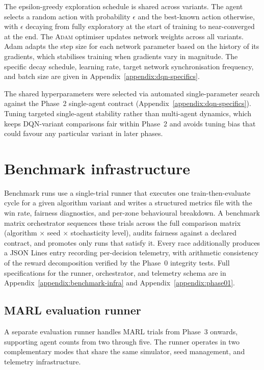 The epsilon-greedy exploration schedule is shared across variants. The agent selects a random action with probability $\epsilon$ and the best-known action otherwise, with $\epsilon$ decaying from fully exploratory at the start of training to near-converged at the end. The \textsc{Adam} optimiser \citep{kingma2015adam} updates network weights across all variants. Adam adapts the step size for each network parameter based on the history of its gradients, which stabilises training when gradients vary in magnitude. The specific decay schedule, learning rate, target network synchronisation frequency, and batch size are given in Appendix~\ref{appendix:dqn-specifics}.

The shared hyperparameters were selected via automated single-parameter search against the Phase~2 single-agent contract (Appendix~\ref{appendix:dqn-specifics}). Tuning targeted single-agent stability rather than multi-agent dynamics, which keeps DQN-variant comparisons fair within Phase~2 and avoids tuning bias that could favour any particular variant in later phases.

\section{Benchmark infrastructure}

Benchmark runs use a single-trial runner that executes one train-then-evaluate cycle for a given algorithm variant and writes a structured metrics file with the win rate, fairness diagnostics, and per-zone behavioural breakdown. A benchmark matrix orchestrator sequences these trials across the full comparison matrix (algorithm $\times$ seed $\times$ stochasticity level), audits fairness against a declared contract, and promotes only runs that satisfy it. Every race additionally produces a JSON Lines entry recording per-decision telemetry, with arithmetic consistency of the reward decomposition verified by the Phase~0 integrity tests. Full specifications for the runner, orchestrator, and telemetry schema are in Appendix~\ref{appendix:benchmark-infra} and Appendix~\ref{appendix:phase01}.

\subsection{MARL evaluation runner}

A separate evaluation runner handles MARL trials from Phase~3 onwards, supporting agent counts from two through five. The runner operates in two complementary modes that share the same simulator, seed management, and telemetry infrastructure.

